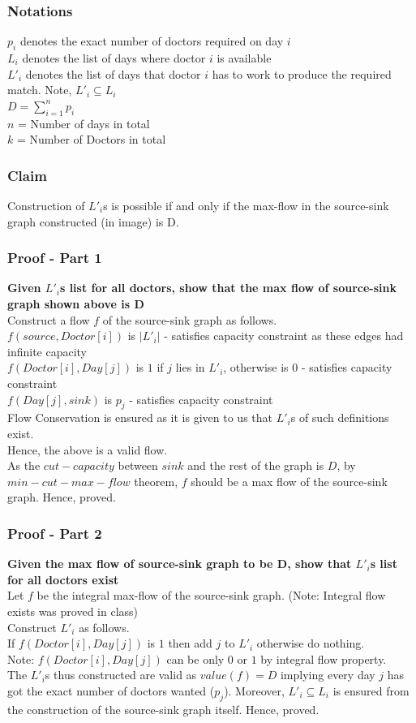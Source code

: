\documentclass{article}
\begin{document}
\subsubsection{Notations}
$p_i$ denotes the exact number of doctors required on day $i$ \\
$L_i$ denotes the list of days where doctor $i$ is available \\
$L'_i$ denotes the list of days that doctor $i$ has to work to produce the required match. Note, $L'_i \subseteq L_i$\\
$D = \sum_{i=1}^{n} p_i$ \\
$n$ = Number of days in total \\
$k$ = Number of Doctors in total \\ 
\subsubsection{Claim}
Construction of $L'_i$s is possible if and only if the max-flow in the source-sink graph constructed (in image) is D.
\subsubsection{Proof - Part 1}
{\bf Given $L'_i$s list for all doctors, show that the max flow of source-sink graph shown above is D \\}
Construct a flow $f$ of the source-sink graph as follows. \\
$f(source,Doctor[i])$ is $|L'_i|$ - satisfies capacity constraint as these edges had infinite capacity \\
$f(Doctor[i], Day[j])$ is $1$ if $j$ lies in $L'_i$, otherwise is $0$ - satisfies capacity constraint \\
$f(Day[j],sink)$ is $p_j$ - satisfies capacity constraint \\
Flow Conservation is ensured as it is given to us that $L'_i$s of such definitions exist. \\
Hence, the above is a valid flow. \\
As the $cut-capacity$ between $sink$ and the rest of the graph is $D$, by $min-cut - max-flow$ theorem, $f$ should be a max flow of the source-sink graph. Hence, proved. 
\subsubsection{Proof - Part 2}
{\bf Given the max flow of source-sink graph to be D, show that $L'_i$s list for all doctors exist \\}
Let $f$ be the integral max-flow of the source-sink graph. (Note: Integral flow exists was proved in class) \\
Construct $L'_i$ as follows. \\
If $f(Doctor[i], Day[j])$ is $1$ then add $j$ to $L'_i$ otherwise do nothing. \\
Note: $f(Doctor[i], Day[j])$ can be only $0$ or $1$ by integral flow property. \\
The $L'_i$s thus constructed are valid as $value(f) = D$ implying every day $j$ has got the exact number of doctors wanted ($p_j$). Moreover, $L'_i \subseteq L_i$ is ensured from the construction of the source-sink graph itself. Hence, proved.
\newpage
\end{document}
